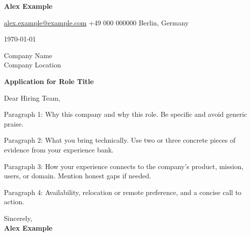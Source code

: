 \documentclass[a4paper,10pt]{article}
\makeatletter
\newcommand{\UserName}{Alex Example}
\newcommand{\UserEmail}{alex.example@example.com}
\newcommand{\UserPhone}{+49 000 000000}
\newcommand{\UserLocation}{Berlin, Germany}
\makeatother
\begin{document}
{\Huge\bfseries\color{accent}\UserName}

\vspace{4pt}
\href{mailto:\UserEmail}{\UserEmail} \textbullet{} \UserPhone \textbullet{} \UserLocation

\vspace{8pt}
\noindent{\color{accent}\rule{\linewidth}{1pt}}

\vspace{12pt}
\today

\vspace{10pt}
Company Name\\
Company Location

\vspace{10pt}
{\large\bfseries Application for Role Title}

Dear Hiring Team,

Paragraph 1: Why this company and why this role. Be specific and avoid generic praise.

Paragraph 2: What you bring technically. Use two or three concrete pieces of evidence from your experience bank.

Paragraph 3: How your experience connects to the company's product, mission, users, or domain. Mention honest gaps if needed.

Paragraph 4: Availability, relocation or remote preference, and a concise call to action.

Sincerely,\\[8pt]
\textbf{\UserName}
\end{document}
